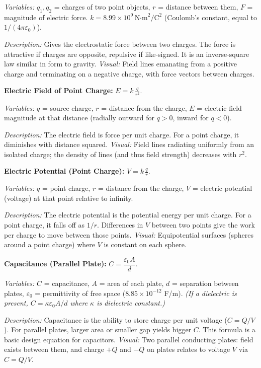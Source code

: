\documentclass{article}
\begin{document}
\textit{Variables:} $q_1, q_2$ = charges of two point objects, $r$ = distance between them, $F$ = magnitude of electric force. $k = 8.99\times10^9\,\text{N·m}^2/\text{C}^2$ (Coulomb’s constant, equal to $1/(4\pi\varepsilon_0)$).

\textit{Description:} Gives the electrostatic force between two charges. The force is attractive if charges are opposite, repulsive if like-signed. It is an inverse-square law similar in form to gravity. \textit{Visual:} Field lines emanating from a positive charge and terminating on a negative charge, with force vectors between charges.

\textbf{Electric Field of Point Charge:} $E = k\,\frac{q}{r^2}$.

\textit{Variables:} $q$ = source charge, $r$ = distance from the charge, $E$ = electric field magnitude at that distance (radially outward for $q>0$, inward for $q<0$).

\textit{Description:} The electric field is force per unit charge. For a point charge, it diminishes with distance squared. \textit{Visual:} Field lines radiating uniformly from an isolated charge; the density of lines (and thus field strength) decreases with $r^2$.

\textbf{Electric Potential (Point Charge):} $V = k\,\frac{q}{r}$.

\textit{Variables:} $q$ = point charge, $r$ = distance from the charge, $V$ = electric potential (voltage) at that point relative to infinity.

\textit{Description:} The electric potential is the potential energy per unit charge. For a point charge, it falls off as $1/r$. Differences in $V$ between two points give the work per charge to move between those points. \textit{Visual:} Equipotential surfaces (spheres around a point charge) where $V$ is constant on each sphere.

\textbf{Capacitance (Parallel Plate):} $C = \dfrac{\varepsilon_0 A}{d}$.

\textit{Variables:} $C$ = capacitance, $A$ = area of each plate, $d$ = separation between plates, $\varepsilon_0$ = permittivity of free space ($8.85\times10^{-12}$ F/m). \textit{(If a dielectric is present, $C = \kappa \varepsilon_0 A/d$ where $\kappa$ is dielectric constant.)}

\textit{Description:} Capacitance is the ability to store charge per unit voltage ($C=Q/V$). For parallel plates, larger area or smaller gap yields bigger $C$. This formula is a basic design equation for capacitors. \textit{Visual:} Two parallel conducting plates: field exists between them, and charge $+Q$ and $-Q$ on plates relates to voltage $V$ via $C=Q/V$.
\end{document}

